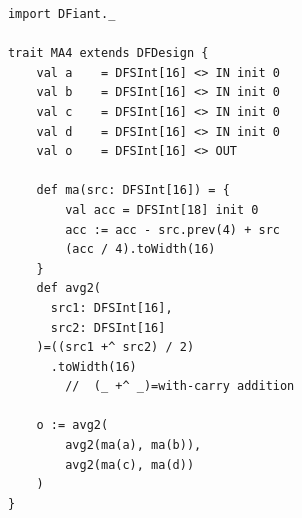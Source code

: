 
\begin{figure}[t!]
  \centering
  \begin{minipage}[b][10.8cm][t]{0.32\linewidth}
    \centering
    \captionsetup{justification=centering}   
    \begin{verbatim}
			import DFiant._
			
			trait MA4 extends DFDesign {
				val a    = DFSInt[16] <> IN init 0
				val b    = DFSInt[16] <> IN init 0
				val c    = DFSInt[16] <> IN init 0
				val d    = DFSInt[16] <> IN init 0
				val o    = DFSInt[16] <> OUT
				
				def ma(src: DFSInt[16]) = {     
					val acc = DFSInt[18] init 0    
					acc := acc - src.prev(4) + src 
					(acc / 4).toWidth(16)
				}
				def avg2(
				  src1: DFSInt[16], 
				  src2: DFSInt[16]
				)=((src1 +^ src2) / 2)
				  .toWidth(16)
					//  (_ +^ _)=with-carry addition
					
				o := avg2(
					avg2(ma(a), ma(b)), 
					avg2(ma(c), ma(d))
				)
			}
			
			
			
			
			

\end{verbatim}
\end{minipage}
\end{figure}
